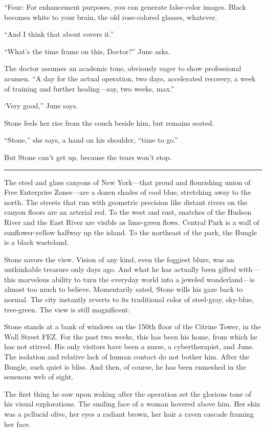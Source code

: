 ``Four: For enhancement purposes, you can generate false-color images. Black becomes white to your brain, the old rose-colored glasses, whatever.

``And I think that about covers it.''

``What's the time frame on this, Doctor?'' June asks.

The doctor assumes an academic tone, obviously eager to show professional acumen. ``A day for the actual operation, two days, accelerated recovery, a week of training and further healing---say, two weeks, max.''

‘Very good,'' June says.

Stone feels her rise from the couch beside him, but remains seated.

``Stone,'' she says, a hand on his shoulder, ``time to go.''

But Stone can't get up, because the tears won't stop.

\fancybreak{* * *}

The steel and glass canyons of New York---that proud and flourishing union of Free Enterprise Zones---are a dozen shades of cool blue, stretching away to the north. The streets that run with geometric precision like distant rivers on the canyon floors are an arterial red. To the west and east, snatches of the Hudson River and the East River are visible as lime-green flows. Central Park is a wall of sunflower-yellow halfway up the island. To the northeast of the park, the Bungle is a black wasteland.

Stone savors the view. Vision of any kind, even the foggiest blurs, was an unthinkable treasure only days ago. And what he has actually been gifted with---this marvelous ability to turn the everyday world into a jeweled wonderland---is almost too much to believe. Momentarily sated, Stone wills his gaze back to normal. The city instantly reverts to its traditional color of steel-gray, sky-blue, tree-green. The view is still magnificent.

Stone stands at a bank of windows on the 150th floor of the Citrine Tower, in the Wall Street FEZ. For the past two weeks, this has been his home, from which he has not stirred. His only visitors have been a nurse, a cybertherapist, and June. The isolation and relative lack of human contact do not bother him. After the Bungle, such quiet is bliss. And then, of course, he has been enmeshed in the sensuous web of sight.

The first thing he saw upon waking after the operation set the glorious tone of his visual explorations. The smiling face of a woman hovered above him. Her skin was a pcllucid olive, her eyes a radiant brown, her hair a raven cascade framing her face.

